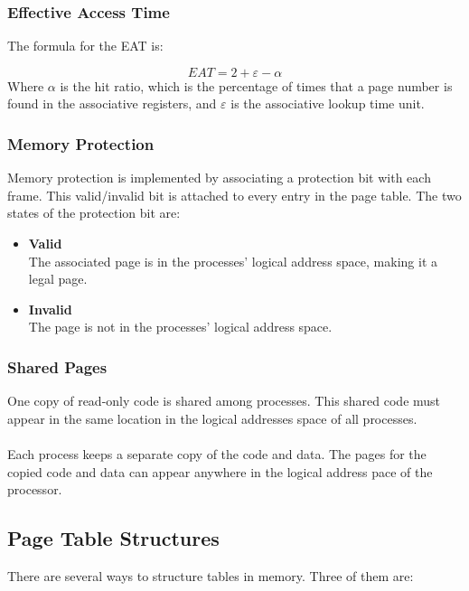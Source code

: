 \documentclass{article}
\begin{document}
\subsubsection{Effective Access Time}
The formula for the EAT is:

\[ EAT = 2 + \varepsilon - \alpha \]
Where $\alpha$ is the hit ratio, which is the percentage of times that a page number is found in the associative registers, and $\varepsilon$ is the associative lookup time unit.

\subsubsection{Memory Protection}
Memory protection is implemented by associating a protection bit with each frame. This valid/invalid bit is attached to every entry in the page table. The two states of the protection bit are:

\begin{itemize}
	\item \textbf{Valid}
	\vspace{.2cm} \\
	The associated page is in the processes' logical address space, making it a legal page.
	
	\item \textbf{Invalid}
	\vspace{.2cm} \\
	The page is not in the processes' logical address space.
\end{itemize}

\subsubsection{Shared Pages}
One copy of read-only code is shared among processes. This shared code must appear in the same location in the logical addresses space of all processes. \\ \\
Each process keeps a separate copy of the code and data. The pages for the copied code and data can appear anywhere in the logical address pace of the processor.

\subsection{Page Table Structures}
There are several ways to structure tables in memory. Three of them are:
\end{document}
